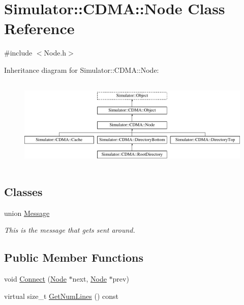 \hypertarget{class_simulator_1_1_c_d_m_a_1_1_node}{\section{Simulator\+:\+:C\+D\+M\+A\+:\+:Node Class Reference}
\label{class_simulator_1_1_c_d_m_a_1_1_node}
}


{\ttfamily \#include $<$Node.\+h$>$}

Inheritance diagram for Simulator\+:\+:C\+D\+M\+A\+:\+:Node\+:\begin{figure}[H]
\begin{center}
\leavevmode
\includegraphics[height=4.402516cm]{class_simulator_1_1_c_d_m_a_1_1_node}
\end{center}
\end{figure}
\subsection*{Classes}
\begin{DoxyCompactItemize}
\item 
union \hyperlink{union_simulator_1_1_c_d_m_a_1_1_node_1_1_message}{Message}
\begin{DoxyCompactList}\small\item\em This is the message that gets sent around. \end{DoxyCompactList}\end{DoxyCompactItemize}
\subsection*{Public Member Functions}
\begin{DoxyCompactItemize}
\item 
void \hyperlink{class_simulator_1_1_c_d_m_a_1_1_node_a5e306df0363210da13b829189e2e4776}{Connect} (\hyperlink{class_simulator_1_1_c_d_m_a_1_1_node}{Node} $\ast$next, \hyperlink{class_simulator_1_1_c_d_m_a_1_1_node}{Node} $\ast$prev)
\item 
virtual size\+\_\+t \hyperlink{class_simulator_1_1_c_d_m_a_1_1_node_a1e5b04d3d6beaa4f1395a2332f105980}{Get\+Num\+Lines} () const 
\end{DoxyCompactItemize}
